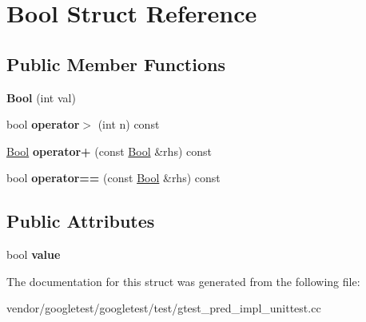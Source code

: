 \hypertarget{struct_bool}{}\section{Bool Struct Reference}
\label{struct_bool}
\subsection*{Public Member Functions}
\begin{DoxyCompactItemize}
\item 
\mbox{\label{struct_bool_a03dfd4851b13abb29414887fcada7fca}} 
{\bfseries Bool} (int val)
\item 
\mbox{\label{struct_bool_a7baecbc58992eb06157fbbbaa560be0b}} 
bool {\bfseries operator$>$} (int n) const
\item 
\mbox{\label{struct_bool_a6f4ecdec19082e896cffce66e6b6e7cc}} 
\mbox{\hyperlink{struct_bool}{Bool}} {\bfseries operator+} (const \mbox{\hyperlink{struct_bool}{Bool}} \&rhs) const
\item 
\mbox{\label{struct_bool_afe799a4977c5ebe4c215d5d4ebd77adb}} 
bool {\bfseries operator==} (const \mbox{\hyperlink{struct_bool}{Bool}} \&rhs) const
\end{DoxyCompactItemize}
\subsection*{Public Attributes}
\begin{DoxyCompactItemize}
\item 
\mbox{\label{struct_bool_a16be863c269f988cdcbe59f9d846a141}} 
bool {\bfseries value}
\end{DoxyCompactItemize}


The documentation for this struct was generated from the following file\+:\begin{DoxyCompactItemize}
\item 
vendor/googletest/googletest/test/gtest\+\_\+pred\+\_\+impl\+\_\+unittest.\+cc\end{DoxyCompactItemize}
